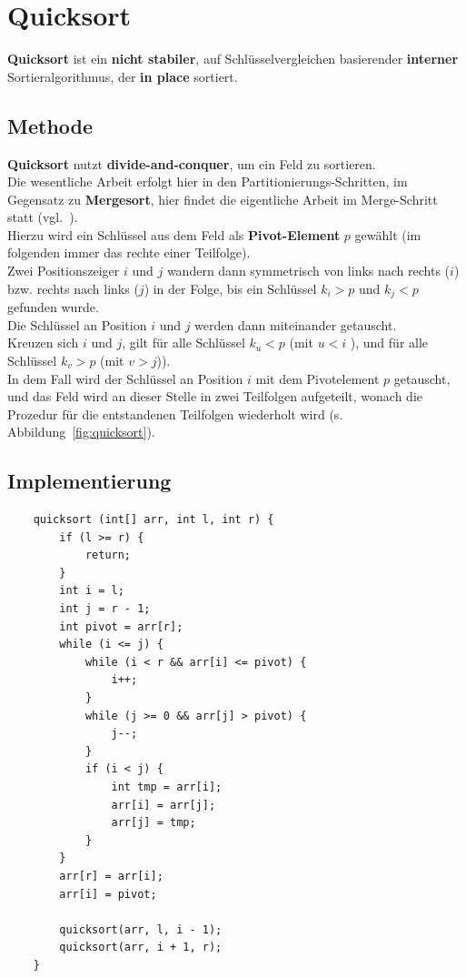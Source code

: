 \section{Quicksort}

\textbf{Quicksort} ist ein \textbf{nicht stabiler}, auf Schlüsselvergleichen basierender \textbf{interner} Sortieralgorithmus, der \textbf{in place} sortiert.

\subsection{Methode}

\textbf{Quicksort} nutzt \textbf{divide-and-conquer}, um ein Feld zu sortieren.\\
Die wesentliche Arbeit erfolgt hier in den Partitionierungs-Schritten, im Gegensatz zu \textbf{Mergesort}, hier findet die eigentliche Arbeit im Merge-Schritt statt (vgl.~\cite[174]{GD18e}).\\

\noindent
Hierzu wird ein Schlüssel aus dem Feld als \textbf{Pivot-Element} $p$ gewählt (im folgenden immer das rechte einer Teilfolge).\\
Zwei Positionszeiger $i$ und $j$ wandern dann symmetrisch von links nach rechts ($i$) bzw. rechts nach links ($j$) in der Folge, bis ein Schlüssel $k_i > p$ und $k_j < p$ gefunden wurde. \\
Die Schlüssel an Position $i$ und $j$ werden dann miteinander getauscht.\\
Kreuzen sich $i$ und $j$, gilt für alle Schlüssel $k_u < p$ (mit $u < i$ ), und für alle Schlüssel $k_v > p$ (mit $v > j$)).\\
In dem Fall wird der Schlüssel an Position $i$ mit dem Pivotelement $p$ getauscht, und das Feld wird an dieser Stelle in zwei Teilfolgen aufgeteilt, wonach die Prozedur für die entstandenen Teilfolgen wiederholt wird (s. Abbildung~\ref{fig:quicksort}).

\subsection{Implementierung}

\begin{verbatim}
    quicksort (int[] arr, int l, int r) {
        if (l >= r) {
            return;
        }
        int i = l;
        int j = r - 1;
        int pivot = arr[r];
        while (i <= j) {
            while (i < r && arr[i] <= pivot) {
                i++;
            }
            while (j >= 0 && arr[j] > pivot) {
                j--;
            }
            if (i < j) {
                int tmp = arr[i];
                arr[i] = arr[j];
                arr[j] = tmp;
            }
        }
        arr[r] = arr[i];
        arr[i] = pivot;

        quicksort(arr, l, i - 1);
        quicksort(arr, i + 1, r);
    }
\end{verbatim}

